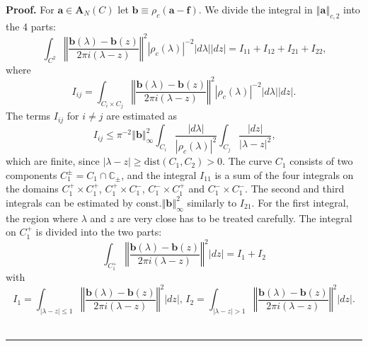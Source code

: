 \documentclass[a4paper]{article}%
\newenvironment{proof}[1][Proof]{\noindent\textbf{#1.} }{\ \rule{0.5em}{0.5em}}
\begin{document}
\begin{proof}
For $\boldsymbol{a}\in\boldsymbol{A}_{N}\left(  C\right)  $ let
$\boldsymbol{b}\equiv\rho_{c}\left(  \boldsymbol{a}-\boldsymbol{f}\right)  $.
We divide the integral in $\left\Vert \boldsymbol{a}\right\Vert _{c,2}$ into
the 4 parts:%
\[
\int_{C^{2}}\left\Vert \dfrac{\boldsymbol{b}\left(  \lambda\right)
-\boldsymbol{b}\left(  z\right)  }{2\pi i\left(  \lambda-z\right)
}\right\Vert ^{2}\left\vert \rho_{c}\left(  \lambda\right)  \right\vert
^{-2}\left\vert d\lambda\right\vert \left\vert dz\right\vert =I_{11}%
+I_{12}+I_{21}+I_{22}\text{,}%
\]
where%
\[
I_{ij}=\int_{C_{i}\times C_{j}}\left\Vert \dfrac{\boldsymbol{b}\left(
\lambda\right)  -\boldsymbol{b}\left(  z\right)  }{2\pi i\left(
\lambda-z\right)  }\right\Vert ^{2}\left\vert \rho_{c}\left(  \lambda\right)
\right\vert ^{-2}\left\vert d\lambda\right\vert \left\vert dz\right\vert
\text{.}%
\]
The terms $I_{ij}$ for $i\neq j$ are estimated as
\[
I_{ij}\leq\pi^{-2}\left\Vert \boldsymbol{b}\right\Vert _{\infty}^{2}%
{\displaystyle\int_{C_{i}}}
\dfrac{\left\vert d\lambda\right\vert }{\left\vert \rho_{c}\left(
\lambda\right)  \right\vert ^{2}}\int_{C_{j}}\dfrac{\left\vert dz\right\vert
}{\left\vert \lambda-z\right\vert ^{2}}\text{,}%
\]
which are finite, since $\left\vert \lambda-z\right\vert \geq\mathrm{dist}%
\left(  C_{1},C_{2}\right)  >0$. The curve $C_{1}$ consists of two components
$C_{1}^{\pm}=C_{1}\cap\mathbb{C}_{\pm}$, and the integral $I_{11}$ is a sum of
the four integrals on the domains $C_{1}^{+}\times C_{1}^{+}$, $C_{1}%
^{+}\times C_{1}^{-}$, $C_{1}^{-}\times C_{1}^{+}$ and $C_{1}^{-}\times
C_{1}^{-}$. The second and third integrals can be estimated by $\mathrm{const}%
.\left\Vert \boldsymbol{b}\right\Vert _{\infty}^{2}$ similarly to $I_{21}$.
For the first integral, the region where $\lambda$ and $z$ are very close has
to be treated carefully. The integral on $C_{1}^{+}$ is divided into the two
parts:
\[
\int_{C_{1}^{+}}\left\Vert \dfrac{\boldsymbol{b}\left(  \lambda\right)
-\boldsymbol{b}\left(  z\right)  }{2\pi i\left(  \lambda-z\right)
}\right\Vert ^{2}\left\vert dz\right\vert =I_{1}+I_{2}%
\]
with%
\[
I_{1}=\int_{\left\vert \lambda-z\right\vert \leq1}\left\Vert \dfrac
{\boldsymbol{b}\left(  \lambda\right)  -\boldsymbol{b}\left(  z\right)  }{2\pi
i\left(  \lambda-z\right)  }\right\Vert ^{2}\left\vert dz\right\vert \text{,
\ }I_{2}=\int_{\left\vert \lambda-z\right\vert >1}\left\Vert \dfrac
{\boldsymbol{b}\left(  \lambda\right)  -\boldsymbol{b}\left(  z\right)  }{2\pi
i\left(  \lambda-z\right)  }\right\Vert ^{2}\left\vert dz\right\vert \text{.}%
\]
\end{proof}
\end{document}

